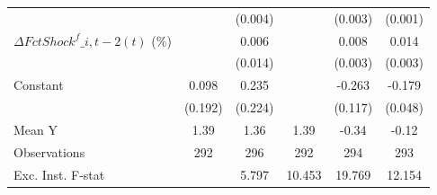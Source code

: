 {\begin{tabular}{l*{5}{c}}
                    &                     &     (0.004)         &                     &     (0.003)         &     (0.001)         \\
\addlinespace
$ \Delta FctShock^f\_{i,t-2}(t)$ (\%)&                     &       0.006         &                     &       0.008\sym{**} &       0.014\sym{***}\\
                    &                     &     (0.014)         &                     &     (0.003)         &     (0.003)         \\
\addlinespace
Constant            &       0.098         &       0.235         &                     &      -0.263\sym{**} &      -0.179\sym{***}\\
                    &     (0.192)         &     (0.224)         &                     &     (0.117)         &     (0.048)         \\
\midrule
Mean Y              &        1.39         &        1.36         &        1.39         &       -0.34         &       -0.12         \\
Observations        &         292         &         296         &         292         &         294         &         293         \\
Exc. Inst. F-stat   &                     &       5.797         &      10.453         &      19.769         &      12.154         \\
\bottomrule
\end{tabular}
}
